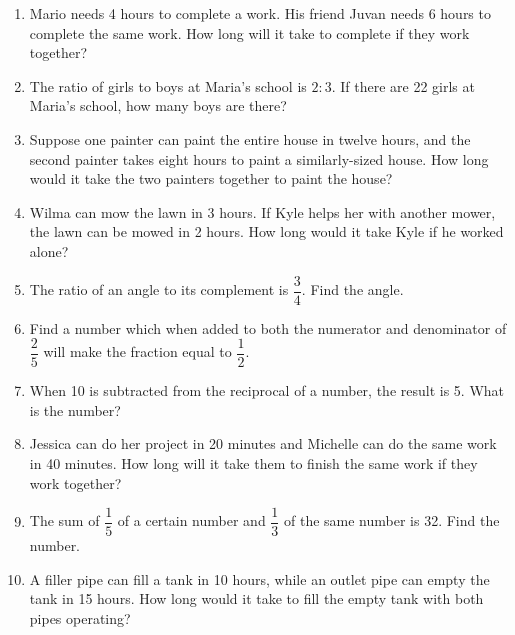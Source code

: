     \begin{enumerate}[resume]
    	\item Mario needs 4 hours to complete a work. His friend Juvan needs 6 hours to complete the same work. How long will it take to complete if they work together?	%
    	\item The ratio of girls to boys at Maria's school is $ 2:3 $. If there are 22 girls at Maria's school, how many boys are there?	%
    	\item Suppose one painter can paint the entire house in twelve hours, and the second painter takes eight hours to paint a similarly-sized house. How long would it take the two painters together to paint the house?	%
    	\item Wilma can mow the lawn in 3 hours. If Kyle helps her with another mower, the lawn can be mowed in 2 hours. How long would it take Kyle if he worked alone? 	%
    	\item The ratio of an angle to its complement is $ \dfrac{3}{4} $. Find the angle.	%
    	\item Find a number which when added to both the numerator and denominator of $ \dfrac{2}{5} $ will make the fraction equal to $ \dfrac{1}{2} $.	%
    	\item When 10 is subtracted from the reciprocal of a number, the result is 5. What is the number?	%
    	\item Jessica can do her project in 20 minutes and Michelle can do the same work in 40 minutes. How long will it take them to finish the same work if they work together?	%
    	\item The sum of $ \dfrac{1}{5} $ of a certain number and $ \dfrac{1}{3} $ of the same number is 32. Find the number. %
    	\item A filler pipe can fill a tank in 10 hours, while an outlet pipe can empty the tank in 15 hours. How long would it take to fill the empty tank with both pipes operating?	%
    \end{enumerate}
    
